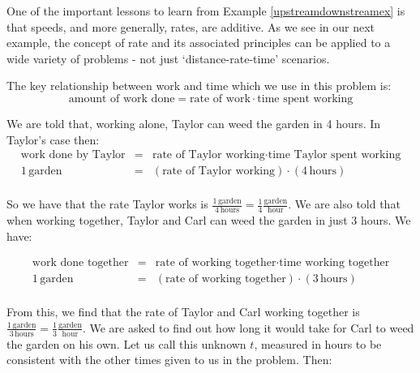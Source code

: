 \medskip

One of the important lessons to learn from Example \ref{upstreamdownstreamex} is that speeds, and more generally, rates, are additive.  As we see in our next example, the concept of rate and its associated principles can be applied to a wide variety of problems - not just `distance-rate-time' scenarios.

\medskip

{
The key relationship between work and time which we use in this problem is: \[\text{amount of work done} = \text{rate of work} \cdot \text{time spent working} \]

We are told that, working alone, Taylor can weed the garden in 4 hours.  In Taylor's case then: \[ \begin{array}{rcl}

\text{work done by Taylor} & = & \text{rate of Taylor working} \cdot \text{time Taylor spent working} \\

1 \, \text{garden} & = & (\text{rate of Taylor working}) \cdot (4 \, \text{hours}) \\ \end{array} \]

So we have that the rate Taylor works is $\frac{1 \, \text{garden}}{ 4 \, \text{hours}} = \frac{1}{4} \frac{\text{garden}}{\text{hour}}$.    We are also told that when working together, Taylor and Carl can weed the garden in just 3 hours.  We have:

\[ \begin{array}{rcl}

\text{work done together} & = & \text{rate of working together} \cdot \text{time  working together} \\

1 \, \text{garden} & = & (\text{rate of working together}) \cdot (3 \, \text{hours}) \\ \end{array} \]

From this, we find that the rate of Taylor and Carl working together is $\frac{1 \, \text{garden}}{3 \, \text{hours}} = \frac{1}{3} \frac{\text{garden}}{\text{hour}}$.   We are asked to find out how long it would take for Carl to weed the garden on his own.  Let us call this unknown $t$, measured in hours to be consistent with the other times given to us in the problem. Then:

}

